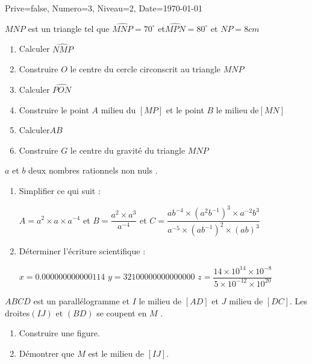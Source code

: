 \documentclass[a4paper,12pt]{article}
\begin{document}
\begin{Maquette}[DM]{Prive=false, Numero=3, Niveau=2, Date=\today}

\begin{exercice}
$MNP$ est un triangle tel que  $\widehat{MNP}=70^{\circ}$ et$\widehat{MPN}=80^{\circ}$ et $NP=8 cm$
\begin{enumerate}
\item Calculer $\widehat{NMP}$
\item Construire  $O$ le centre du cercle circonscrit au triangle $MNP$
\item Calculer $\widehat{PON}$
\item Construire le point  $A$ milieu du  $[MP]$ et le point $B$ le milieu de$[MN]$
\item Calculer$AB$
\item Construire $G$ le centre du gravité du triangle $MNP$

\end{enumerate}

\end{exercice}

\begin{exercice}
$a$ et $b$ deux nombres rationnels non nuls .
\begin{enumerate}
\item Simplifier ce qui suit :

$A=a^{2}\times a \times a^{-4} $ \hspace{1cm} et $B=\dfrac{a^{2}\times a^{3}}{a^{-4}}$ \hspace{1cm} et
$C=\dfrac{ab^{-4}\times (a^{2}b^{-1})^{3}\times a^{-2}b^{3}}{a^{-5}\times (ab^{-1})^{2}\times (ab)^{3}}$
\item Déterminer l'écriture scientifique : 

$x=0.000000000000114$\hspace{1cm}
$y=32100000000000000$\hspace{1cm}
$z=\dfrac{14\times 10^{14}\times 10^{-8}}{5\times 10^{-12}\times 10^{20}}$

\end{enumerate}

\end{exercice}

\begin{exercice}
$ABCD$ est un parallélogramme et  $I$ le milieu de  $[AD]$ et $J$ milieu de $[DC]$. Les droites$(IJ)$ et $(BD)$ se coupent en  $M$ .
\begin{enumerate}
\item Construire une figure.
\item Démontrer que $M$ est le milieu de $[IJ]$.
\end{enumerate}
\end{exercice}


\end{Maquette}
\end{document}
